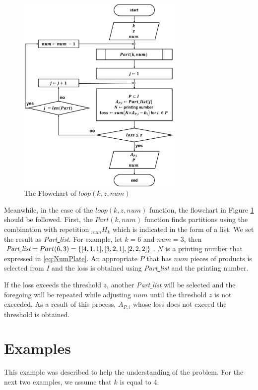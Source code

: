 \documentclass[a4paper]{amsart}
\numberwithin{equation}{section} %
\numberwithin{figure}{section} %
\numberwithin{table}{section}
\theoremstyle{plain}
\theoremstyle{definition}
\theoremstyle{plain}
\theoremstyle{plain}
\theoremstyle{plain}
\theoremstyle{plain}
\theoremstyle{plain}
\begin{document}
\begin{figure}[h!]
	\centering
	\includegraphics[width=8cm]{SubFChart.pdf}
	\caption{The Flowchart of ${loop}(k, z, num)$}
	\label{fig:SFChart}       %
\end{figure}

Meanwhile, in the case of the ${loop}(k, z, num)$ function, the flowchart in Figure \ref{fig:SFChart} should be followed.
First, the ${Part}(k, num)$ function finds partitions using the combination with repetition $_{num}H_{k}$ which is indicated in the form of a list. 
We set the result as {\it Part\underline{ }list}.
For example, let $k=6$ and $num=3$, then $\text{\it Part\underline{ }list}={Part}(6, 3) = \{ [4,1,1],[3,2,1],[2,2,2] \}$.
$N$ is a printing number that expressed in \eqref{eq:NumPlate}.
An appropriate $P$ that has $num$ pieces of products is selected from $I$ and the loss is obtained using {\it Part\underline{ }list} and the printing number.

If the loss exceeds the threshold $z$, another {\it Part\underline{ }list} will be selected and the foregoing will be repeated  while adjusting $num$ until the threshold $z$ is not exceeded.
As a result of this process, $A_{P,i}$ whose loss does not exceed the threshold is obtained.%



\section{Examples}\label{sec:Exam}
This example was described to help the understanding of the problem. For the next two examples, we assume that $k$ is equal to 4.
\end{document}
